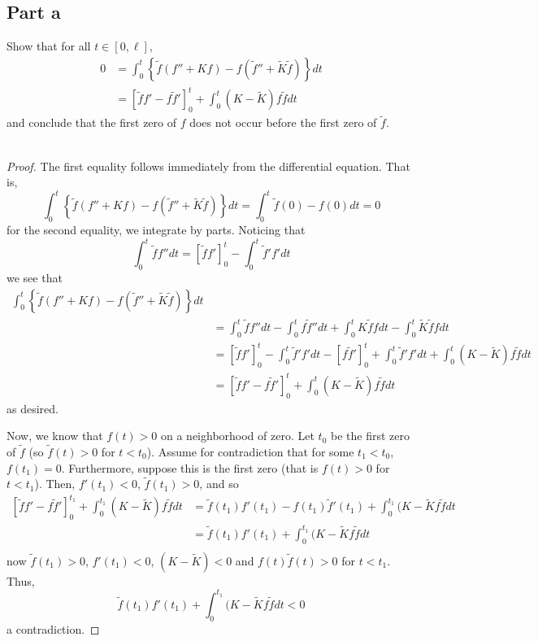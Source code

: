 \documentclass[fontsize=11pt]{scrartcl} %
\numberwithin{equation}{section} %
\numberwithin{figure}{section} %
\numberwithin{table}{section} %
\begin{document}
\subsection*{Part a}
Show that for all $t\in [0,\ell]$,
\[
    \begin{aligned}
    0 &= \int_0^t\left\{ \tilde{f}(f''+Kf) - f(\tilde{f}'' +
    \tilde{K}\tilde{f}) \right\}dt\\
        &= [\tilde{f}f' - f\tilde{f}']_0^t +
    \int_0^t(K-\tilde{K})f\tilde{f}dt
    \end{aligned}
\]
and conclude that the first zero of $f$ does not occur before the first zero of
$\tilde{f}$.
\\
\\
\begin{proof}
    The first equality follows immediately from the differential equation. That
    is,
    \[
     \int_0^t\left\{ \tilde{f}(f''+Kf) - f(\tilde{f}'' +
     \tilde{K}\tilde{f}) \right\}dt = \int_0^t\tilde{f}(0) - f(0) dt = 0
    \]
    for the second equality, we integrate by parts. Noticing that
    \[
        \int_0^t\tilde{f}f''dt = [\tilde{f}f']_0^t - \int_0^t\tilde{f}'f'dt
    \]
    we see that
    \[
        \begin{aligned}
     \int_0^t\left\{ \tilde{f}(f''+Kf) - f(\tilde{f}'' +
     \tilde{K}\tilde{f}) \right\}dt\\
        &= \int_0^t\tilde{f}f''dt - \int_0^tf\tilde{f}''dt +
        \int_0^tK\tilde{f}fdt - \int_0^t\tilde{K}\tilde{f}fdt\\
        &=[\tilde{f}f']_0^t - \int_0^t\tilde{f}'f'dt - [f\tilde{f}']_0^t +
        \int_0^t\tilde{f}'f'dt + \int_0^t(K-\tilde{K})f\tilde{f}dt\\
        &=[\tilde{f}f'-f\tilde{f}']_0^t + \int_0^t(K-\tilde{K})f\tilde{f}dt
        \end{aligned}
    \]
    as desired.

    Now, we know that $f(t)>0$ on a neighborhood of zero. Let $t_0$ be the first
    zero of $\tilde{f}$ (so $\tilde{f}(t)>0$ for $t<t_0$). Assume for
    contradiction that for some $t_1<t_0$, $f(t_1)=0$. Furthermore, suppose this
    is the first zero (that is $f(t)>0$ for $t< t_1$). Then, $f'(t_1)<0$,
    $\tilde{f}(t_1)>0$, and so
    \[
        \begin{aligned}
            \left[\tilde{f}f'-f\tilde{f}'\right]_0^{t_1} +
            \int_0^{t_1}(K-\tilde{K})f\tilde{f}dt
            &= \tilde{f}(t_1)f'(t_1)-f(t_1)\tilde{f}'(t_1) +
            \int_0^{t_1}(K-\tilde{K}f\tilde{f}dt\\
            &= \tilde{f}(t_1)f'(t_1) +
            \int_0^{t_1}(K-\tilde{K}f\tilde{f}dt\\
        \end{aligned}
    \]
    now $\tilde{f}(t_1)>0$, $f'(t_1)<0$, $(K-\tilde{K})<0$ and
    $f(t)\tilde{f}(t)>0$ for $t<t_1$. Thus,
    \[
            \tilde{f}(t_1)f'(t_1) +
            \int_0^{t_1}(K-\tilde{K}f\tilde{f}dt <0
    \]
    a contradiction.
\end{proof}
\end{document}
